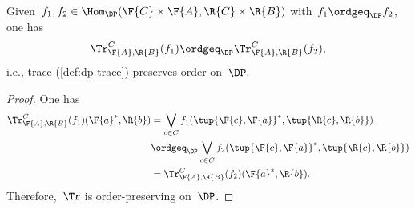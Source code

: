\begin{lemma}
Given~$f_1,f_2\in \Hom_\DP(\F{C}\times \F{A},\R{C}\times \R{B})$ with~$f_1\ordgeq_\DP f_2$, one has
\begin{equation}
    \Tr_{\F{A},\R{B}}^C(f_1)\ordgeq_\DP \Tr_{\F{A},\R{B}}^C(f_2),
\end{equation}
i.e., trace (\cref{def:dp-trace}) preserves order on~$\DP$.
\end{lemma}

\begin{proof}
One has
\begin{equation}
    \begin{aligned}
    \Tr_{\F{A},\R{B}}^C(f_1)(\F{a}^*,\R{b})&=\bigvee_{c\in C}f_1(\tup{\F{c},\F{a}}^*,\tup{\R{c},\R{b}})\\
    &\ordgeq_\DP \bigvee_{c\in C}f_2(\tup{\F{c},\F{a}}^*,\tup{\R{c},\R{b}})\\
    &=\Tr_{\F{A},\R{B}}^C(f_2)(\F{a}^*,\R{b}).
    \end{aligned}
\end{equation}
Therefore,~$\Tr$ is order-preserving on~$\DP$.
\end{proof}